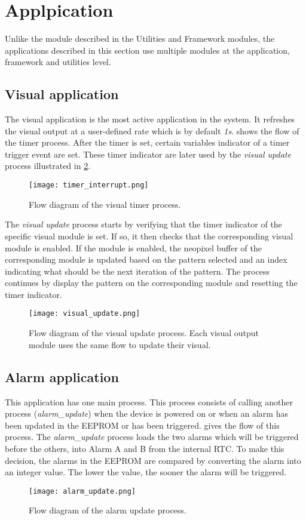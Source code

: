 \section{Applpication}
Unlike the module described in the Utilities and Framework modules, the applications described in this section use multiple modules at the application, framework and utilities level.  

\subsection{Visual application}
The visual application is the most active application in the system. It refreshes the visual output at a user-defined rate which is by default \textit{1s}.  shows the flow of the timer process. After the timer is set, certain variables indicator of a timer trigger event are set. These timer indicator are later used by the \textit{visual update} process illustrated in \cref{fig:visual_update}.
\begin{figure}[ht]
\centering
\texttt{[image: timer\_interrupt.png]}
\caption{Flow diagram of the visual timer process.}
\label{fig:timer_interrupt}
\end{figure}
The \textit{visual update} process starts by verifying that the timer indicator of the specific visual module is set. If so, it then checks that the corresponding visual module is enabled. If the module is enabled, the neopixel buffer of the corresponding module is updated based on the pattern selected and an index indicating what should be the next iteration of the pattern. The process continues by display the pattern on the corresponding module and resetting the timer indicator.
\begin{figure}[ht]
\centering
\texttt{[image: visual\_update.png]}
\caption{Flow diagram of the visual update process. Each visual output module uses the same flow to update their visual.}
\label{fig:visual_update}
\end{figure}


\subsection{Alarm application}
This application has one main process. This process consists of calling another process (\textit{alarm\_update}) when the device is powered on or when an alarm has been updated in the EEPROM or has been triggered.  gives the flow of this process. The \textit{alarm\_update} process loads the two alarms which will be triggered before the others, into Alarm A and B from the internal RTC. To make this decision, the alarms in the EEPROM are compared by converting the alarm into an integer value. The lower the value, the sooner the alarm will be triggered.
\begin{figure}[h!]
\centering
\texttt{[image: alarm\_update.png]}
\caption{Flow diagram of the alarm update process.}
\label{fig:alarm_update}
\end{figure}



